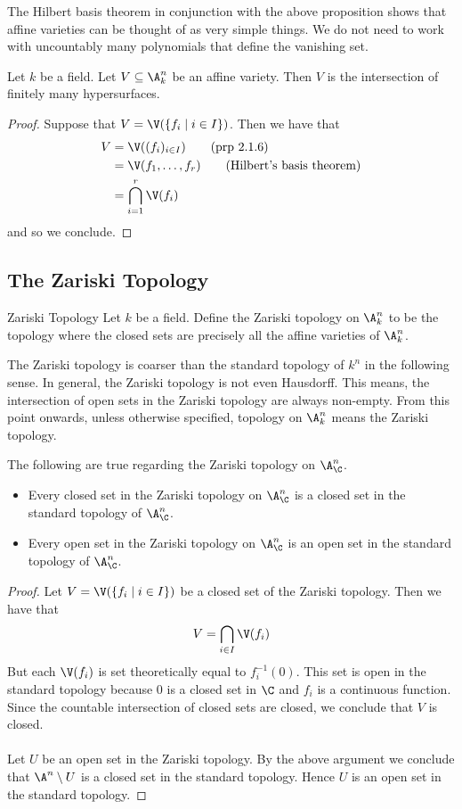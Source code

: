 \documentclass[a4paper]{article}
\begin{document}
The Hilbert basis theorem in conjunction with the above proposition shows that affine varieties can be thought of as very simple things. We do not need to work with uncountably many polynomials that define the vanishing set. 

\begin{crl}{}{} Let $k$ be a field. Let $V\subseteq\A_k^n$ be an affine variety. Then $V$ is the intersection of finitely many hypersurfaces. 
\begin{proof}
Suppose that $V=\V(\{f_i\;|\;i\in I\})$. Then we have that 
\begin{align*}
V&=\V((f_i)_{i\in I})\tag{prp 2.1.6}\\
&=\V(f_1,\dots,f_r)\tag{Hilbert's basis theorem}\\
&=\bigcap_{i=1}^r\V(f_i)
\end{align*}
and so we conclude. 
\end{proof}
\end{crl}

\subsection{The Zariski Topology}
\begin{defn}{Zariski Topology}{} Let $k$ be a field. Define the Zariski topology on $\A_k^n$ to be the topology where the closed sets are precisely all the affine varieties of $\A_k^n$. 
\end{defn}

The Zariski topology is coarser than the standard topology of $k^n$ in the following sense. In general, the Zariski topology is not even Hausdorff. This means, the intersection of open sets in the Zariski topology are always non-empty. From this point onwards, unless otherwise specified, topology on $\A_k^n$ means the Zariski topology. 

\begin{lmm}{}{} The following are true regarding the Zariski topology on $\A_\C^n$. 
\begin{itemize}
\item Every closed set in the Zariski topology on $\A_\C^n$ is a closed set in the standard topology of $\A_\C^n$. 
\item Every open set in the Zariski topology on $\A_\C^n$ is an open set in the standard topology of $\A_\C^n$. 
\end{itemize} 
\begin{proof}
Let $V=\V(\{f_i\;|\;i\in I\})$ be a closed set of the Zariski topology. Then we have that $$V=\bigcap_{i\in I}\V(f_i)$$ But each $\V(f_i)$ is set theoretically equal to $f_i^{-1}(0)$. This set is open in the standard topology because $0$ is a closed set in $\C$ and $f_i$ is a continuous function. Since the countable intersection of closed sets are closed, we conclude that $V$ is closed. \\~\\

Let $U$ be an open set in the Zariski topology. By the above argument we conclude that $\A^n\setminus U$ is a closed set in the standard topology. Hence $U$ is an open set in the standard topology. 
\end{proof}
\end{lmm}
\end{document}

